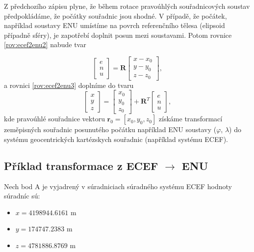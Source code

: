 \documentclass[11pt,a4paper]{article}
\begin{document}
Z předchozího zápisu plyne, že během rotace pravoúhlých souřadnicových soustav předpokládáme, že počátky souřadnic jsou shodné. V případě, že počátek, například soustavy ENU umístíme na povrch referenčního tělesa (elipsoid případně sféry), je zapotřebí doplnit posun mezi soustavami. Potom rovnice \ref{rov:ecef2enu2} nabude tvar

\begin{equation}
\begin{bmatrix}
e \\
n \\
u
\end{bmatrix} =
\mathbf{R}
\begin{bmatrix}
x - x_{0} \\
y - y_{0} \\
z - z_{0}
\end{bmatrix},
\label{rov:ecef2enu22}
\end{equation}
a rovnici \ref{rov:ecef2enu3} doplníme do tvaru
\begin{equation}
\begin{bmatrix}
x \\
y \\
z
\end{bmatrix} =
\begin{bmatrix}
x_{0} \\
y_{0} \\
z_{0}
\end{bmatrix} + 
\mathbf{R}^{T}
\begin{bmatrix}
e \\
n \\
u
\end{bmatrix},
\label{rov:ecef2enu33}
\end{equation}
kde pravoúhlé souřadnice vektoru $\mathbf{r}_{0}=\left[x_{0}, y_{0}, z_{0} \right]$ získáme transformací zeměpisných souřadnic posunutého počátku například ENU soustavy ($\varphi$, $\lambda$) do systému geocentrických kartézskych souřadnic (například systému ECEF).

\subsection{Příklad transformace z ECEF $\rightarrow$ ENU}

Nech bod A je vyjadrený v súradniciach súradného systému ECEF hodnoty súradníc sú:
\begin{itemize}
\item $x = 4198944.6161$ m
\item $y = 174747.2383$ m
\item $z = 4781886.8769$ m
\end{itemize}
\end{document}
